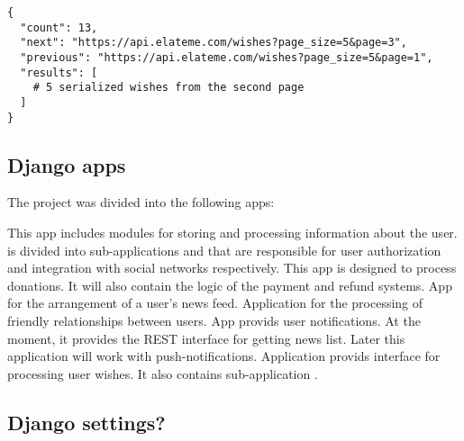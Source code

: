 \begin{lstlisting}
{
  "count": 13,
  "next": "https://api.elateme.com/wishes?page_size=5&page=3",
  "previous": "https://api.elateme.com/wishes?page_size=5&page=1",
  "results": [
    # 5 serialized wishes from the second page
  ]
}
\end{lstlisting}


\subsection{Django apps}
The project was divided into the following apps:

\begin{itemize}

 This app includes modules for storing and processing information about the user.  is
divided into sub-applications  and  that are responsible for user authorization and
integration with social networks respectively.
 This app is designed to process donations. It will also contain the logic of the payment and refund
systems.
 App for the arrangement of a user's news feed.
 Application for the processing of friendly relationships between users.
 App provids user notifications. At the moment, it provides the REST interface for getting news
list. Later this application will work with push-notifications.
 Application provids interface for processing user wishes. It also contains sub-application .

\end{itemize}

\subsection{Django settings?}


